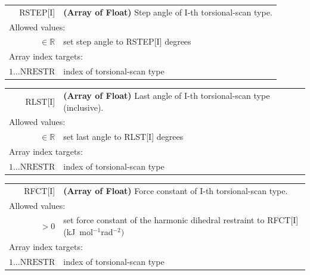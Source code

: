 \documentclass[10pt,a4paper,openany]{memoir}
\numberwithin{equation}{section}
\begin{document}
{
\begin{tabular}{r@{ : }l}
\label{descr:rstep}
     RSTEP[I]&\textbf{(Array of Float)} Step angle of I-th torsional-scan type.                                                                    \\ 
\multicolumn{2}{l}{Allowed values:} \\ 
\(\in\mathbb{R}\)&set step angle to RSTEP[I] degrees                                                                      \\ 
\multicolumn{2}{l}{Array index targets:} \\ 
\(1 \ldots \text{NRESTR} \)&index of torsional-scan type                                                                      \\ 
\end{tabular}
\vspace{1ex}
}

{
\begin{tabular}{r@{ : }l}
\label{descr:rlst}
      RLST[I]&\textbf{(Array of Float)} Last angle of I-th torsional-scan type (inclusive).                                                        \\ 
\multicolumn{2}{l}{Allowed values:} \\ 
\(\in\mathbb{R}\)&set last angle to RLST[I] degrees                                                                       \\ 
\multicolumn{2}{l}{Array index targets:} \\ 
\(1 \ldots \text{NRESTR} \)&index of torsional-scan type                                                                      \\ 
\end{tabular}
\vspace{1ex}
}

{
\begin{tabular}{r@{ : }l}
\label{descr:rfct}
      RFCT[I]&\textbf{(Array of Float)} Force constant of I-th torsional-scan type.                                      \\ 
\multicolumn{2}{l}{Allowed values:} \\ 
    \(>0\)&set force constant of the harmonic dihedral restraint to RFCT[I] (kJ~mol$^{-1}$rad$^{-2})$        \\ 
\multicolumn{2}{l}{Array index targets:} \\ 
\(1 \ldots \text{NRESTR} \)&index of torsional-scan type                                                                      \\ 
\end{tabular}
\vspace{1ex}
}
\end{document}
